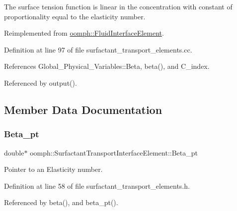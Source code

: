 The surface tension function is linear in the concentration with constant of proportionality equal to the elasticity number. 

Reimplemented from \hyperlink{classoomph_1_1FluidInterfaceElement_a7e5c3ca1eba5d4dd44c0eab9be252c2a}{oomph\+::\+Fluid\+Interface\+Element}.



Definition at line 97 of file surfactant\+\_\+transport\+\_\+elements.\+cc.



References Global\+\_\+\+Physical\+\_\+\+Variables\+::\+Beta, beta(), and C\+\_\+index.



Referenced by output().



\subsection{Member Data Documentation}
\mbox{\label{classoomph_1_1SurfactantTransportInterfaceElement_ab5140eb5a576820321032b10a894b530}} 
\subsubsection{\texorpdfstring{Beta\+\_\+pt}{Beta\_pt}}
{\footnotesize\ttfamily double$\ast$ oomph\+::\+Surfactant\+Transport\+Interface\+Element\+::\+Beta\+\_\+pt\hspace{0.3cm}{\ttfamily [private]}}



Pointer to an Elasticity number. 



Definition at line 58 of file surfactant\+\_\+transport\+\_\+elements.\+h.



Referenced by beta(), and beta\+\_\+pt().

\mbox{\label{classoomph_1_1SurfactantTransportInterfaceElement_a26727fb7b57f88d3e1bdf4f2dd9f3b02}} 
